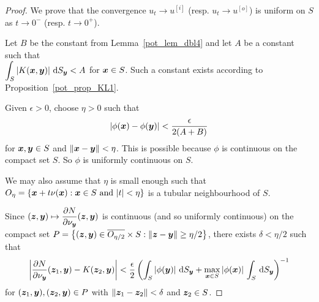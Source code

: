\begin{proof}
We prove that the convergence $u_t \rightarrow u^{[i]}$ (resp.
$u_t \rightarrow u^{[o]}$) is uniform on $S$ as
$t\rightarrow 0^-$ (resp. $t\rightarrow 0^+$).

Let $B$ be the constant from Lemma~\ref{pot_lem_dbl4} and let $A$
be a constant such that \\
$\displaystyle \int_S \left| K({\bm{x}},{\bm{y}}) \right|
\,\mathrm{d}{S}_{{\bm{y}}} < A$ for ${\bm{x}} \in S$.  Such a constant exists according
to Proposition~\ref{pot_prop_KL1}.

Given $\epsilon >0$, choose $\eta>0$ such that
\begin{equation} \label{pot_dblp_B2}
\left|\phi({\bm{x}}) - \phi({\bm{y}}) \right| < \frac{\epsilon}{2(A + B)}
\end{equation}
for ${\bm{x}}, {\bm{y}} \in S$ and $\|{\bm{x}} - {\bm{y}}\| < \eta$.
This is possible because $\phi$ is continuous on the compact
set $S$.  So $\phi$ is uniformly continuous on
$S$.

We may also assume that $\eta$ is small enough such that
$\displaystyle
O_\eta = \left\{ {\bm{x}} + t \nu({\bm{x}}) : {\bm{x}} \in S
\ \text{and} \ |t| < \eta \right\}$
is a tubular neighbourhood of $S$.

Since
$\displaystyle
({\bm{z}},{\bm{y}}) \mapsto \frac{\partial{N}}{\partial \nu_{{\bm{y}}}}({\bm{z}},{\bm{y}})$ is
continuous (and so uniformly continuous) on the compact set
$\displaystyle
P = \left\{ ({\bm{z}},{\bm{y}}) \in \overline{O_{\eta/2}} \times S
: \| {\bm{z}}-{\bm{y}} \| \geq \eta/2 \right\}$,
there exists $\delta < \eta/2$ such that
\begin{equation} \label{pot_dblp_B1}
\left| \frac{\partial{N}}{\partial \nu_{{\bm{y}}}}({\bm{z}}_1,{\bm{y}})
 - K({\bm{z}}_2,{\bm{y}})
\right| < \frac{\epsilon}{2} \left(\int_S
\left| \phi({\bm{y}}) \right| \,\mathrm{d}{S}_{{\bm{y}}} + \max_{{\bm{x}}\in S}
|\phi({\bm{x}})|\, \int_S \,\mathrm{d}{S}_{{\bm{y}}} \right)^{-1}
\end{equation}
for $({\bm{z}}_1,{\bm{y}}) , ({\bm{z}}_2,{\bm{y}}) \in P$ with
$\|{\bm{z}}_1-{\bm{z}}_2\| < \delta$ and ${\bm{z}}_2 \in S$.


\end{proof}
